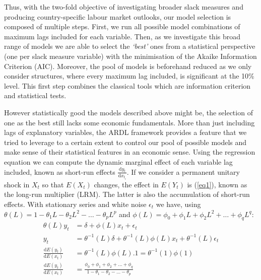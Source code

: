 Thus, with the two-fold objective of investigating broader slack measures and producing country-specific labour market outlooks, our model selection is composed of multiple steps. 
First, we run all possible model combinations of maximum lags included for each variable. 
Then, as we investigate this broad range of models we are able to select the \textit{‘best’} ones from a statistical perspective (one per slack measure variable) with the minimisation of the Akaike Information Criterion (AIC). 
Moreover, the pool of models is beforehand reduced as we only consider structures, where every maximum lag included, is significant at the 10\% level. 
This first step combines the classical tools which are information criterion and statistical tests.

However statistically good the models described above might be, the selection of one as the best still lacks some economic fundamentals. 
More than just including lags of explanatory variables, the ARDL framework provides a feature that we tried to leverage to a certain extent to control our pool of possible models and make sense of their statistical features in an economic sense. 
Using the regression equation we can compute the dynamic marginal effect of each variable lag included, known as short-run effects $\frac{\mathrm{d}y_{t}}{\mathrm{d}x_{t_{i}}}$. 
If we consider a permanent unitary shock in $X_{t}$ so that $E(X_{t})$ changes, the effect in $E(Y_{t})$ is (\ref{eq1}), known as the long-run multiplier (LRM). The latter is also the accumulation of short-run effects. 
\newpage
With stationary series and white noise $\epsilon_{t}$ we have, using $\theta (L) = 1 - \theta_{1}L - \theta_{2}L^{2} - \dots - \theta_{p}L^{p}$ and $\phi (L) = \phi_{0} + \phi_{1}L + \phi_{2}L^{2} + \dots + \phi_{q}L^{q}$:
\vspace{-0.3cm}
\begin{align}
    \theta (L)y_{t} &= \delta + \phi (L)x_{t} + \epsilon_{t} \nonumber \\
    y_{t} &= \theta^{-1} (L)\delta + \theta^{-1} (L)\phi (L)x_{t} + \theta^{-1} (L)\epsilon_{t} \nonumber \\
    \frac{\mathrm{d}E(y_{t})}{\mathrm{d}E(x_{t})} &= \theta^{-1} (L)\phi (L).1 = \theta^{-1} (1)\phi (1) \nonumber\\
    \frac{\mathrm{d}E(y_{t})}{\mathrm{d}E(x_{t})} &= \frac{\phi_{0} + \phi_{1} + \phi_{2} + \dots + \phi_{q}}{1 - \theta_{1} - \theta_{2} - \dots - \theta_{p}} \label{eq1}
\end{align}

